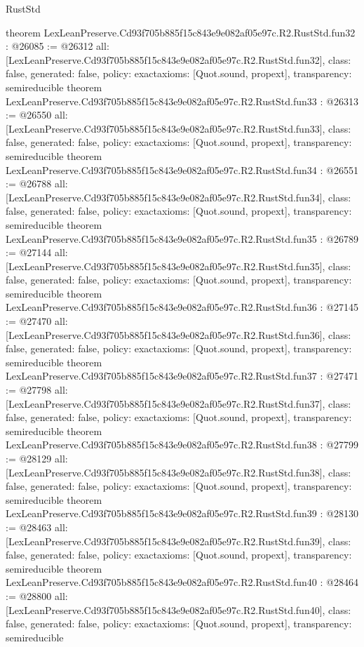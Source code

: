 \begin{lexlean}{RustStd}
\begin{coremodule}
{}
theorem LexLeanPreserve.Cd93f705b885f15c843e9e082af05e97c.R2.RustStd.fun32 : @26085 := @26312 {
  all: [LexLeanPreserve.Cd93f705b885f15c843e9e082af05e97c.R2.RustStd.fun32],
  class: false,
  generated: false,
  policy: exact{axioms: [Quot.sound, propext]},
  transparency: semireducible
}
theorem LexLeanPreserve.Cd93f705b885f15c843e9e082af05e97c.R2.RustStd.fun33 : @26313 := @26550 {
  all: [LexLeanPreserve.Cd93f705b885f15c843e9e082af05e97c.R2.RustStd.fun33],
  class: false,
  generated: false,
  policy: exact{axioms: [Quot.sound, propext]},
  transparency: semireducible
}
theorem LexLeanPreserve.Cd93f705b885f15c843e9e082af05e97c.R2.RustStd.fun34 : @26551 := @26788 {
  all: [LexLeanPreserve.Cd93f705b885f15c843e9e082af05e97c.R2.RustStd.fun34],
  class: false,
  generated: false,
  policy: exact{axioms: [Quot.sound, propext]},
  transparency: semireducible
}
theorem LexLeanPreserve.Cd93f705b885f15c843e9e082af05e97c.R2.RustStd.fun35 : @26789 := @27144 {
  all: [LexLeanPreserve.Cd93f705b885f15c843e9e082af05e97c.R2.RustStd.fun35],
  class: false,
  generated: false,
  policy: exact{axioms: [Quot.sound, propext]},
  transparency: semireducible
}
theorem LexLeanPreserve.Cd93f705b885f15c843e9e082af05e97c.R2.RustStd.fun36 : @27145 := @27470 {
  all: [LexLeanPreserve.Cd93f705b885f15c843e9e082af05e97c.R2.RustStd.fun36],
  class: false,
  generated: false,
  policy: exact{axioms: [Quot.sound, propext]},
  transparency: semireducible
}
theorem LexLeanPreserve.Cd93f705b885f15c843e9e082af05e97c.R2.RustStd.fun37 : @27471 := @27798 {
  all: [LexLeanPreserve.Cd93f705b885f15c843e9e082af05e97c.R2.RustStd.fun37],
  class: false,
  generated: false,
  policy: exact{axioms: [Quot.sound, propext]},
  transparency: semireducible
}
theorem LexLeanPreserve.Cd93f705b885f15c843e9e082af05e97c.R2.RustStd.fun38 : @27799 := @28129 {
  all: [LexLeanPreserve.Cd93f705b885f15c843e9e082af05e97c.R2.RustStd.fun38],
  class: false,
  generated: false,
  policy: exact{axioms: [Quot.sound, propext]},
  transparency: semireducible
}
theorem LexLeanPreserve.Cd93f705b885f15c843e9e082af05e97c.R2.RustStd.fun39 : @28130 := @28463 {
  all: [LexLeanPreserve.Cd93f705b885f15c843e9e082af05e97c.R2.RustStd.fun39],
  class: false,
  generated: false,
  policy: exact{axioms: [Quot.sound, propext]},
  transparency: semireducible
}
theorem LexLeanPreserve.Cd93f705b885f15c843e9e082af05e97c.R2.RustStd.fun40 : @28464 := @28800 {
  all: [LexLeanPreserve.Cd93f705b885f15c843e9e082af05e97c.R2.RustStd.fun40],
  class: false,
  generated: false,
  policy: exact{axioms: [Quot.sound, propext]},
  transparency: semireducible
}
\end{coremodule}
\end{lexlean}
